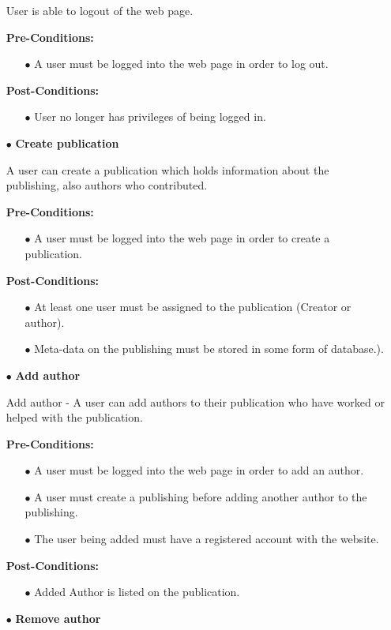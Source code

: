 \documentclass[a4paper,12pt]{article}
\begin{document}
\begin{itemize}
	User is able to logout of the web page.

	\textbf{Pre-Conditions:}
	\begin{itemize}
		\item[$\bullet$]A user must be logged into the web page in order to log out.
		\\
	\end{itemize}
	\textbf{Post-Conditions: }
	\begin{itemize}
		\item[$\bullet$]User no longer has privileges of being logged in.
		\\
	\end{itemize}
	\item[$\bullet$]\textbf{Create publication}

	A user can create a publication which holds information about the publishing, also authors who contributed.

	\textbf{Pre-Conditions:}
	\begin{itemize}
		\item[$\bullet$]A user must be logged into the web page in order to create a publication.
		\\
	\end{itemize}
	\textbf{Post-Conditions: }
	\begin{itemize}
		\item[$\bullet$]At least one user must be assigned to the publication (Creator or author).
		\item[$\bullet$]Meta-data on the publishing must be stored in some form of database.).
		\\
	\end{itemize}
	\item[$\bullet$]\textbf{Add author}

	Add author - A user can add authors to their publication who have worked or helped with the publication.

	\textbf{Pre-Conditions:}
	\begin{itemize}
		\item[$\bullet$]A user must be logged into the web page in order to add an author.
		\item[$\bullet$]A user must create a publishing before adding another author to the publishing.
		\item[$\bullet$]The user being added must have a registered account with the website.
		\\
	\end{itemize}
	\textbf{Post-Conditions: }
	\begin{itemize}
		\item[$\bullet$]Added Author is listed on the publication.
		\\
	\end{itemize}
	\item[$\bullet$]\textbf{Remove author}


\end{itemize}
\end{document}
